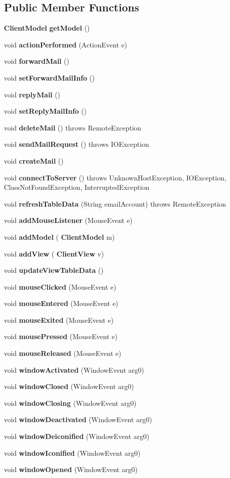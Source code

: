 \subsection*{Public Member Functions}
\begin{DoxyCompactItemize}
\item 
\textbf{ Client\+Model} \textbf{ get\+Model} ()
\item 
void \textbf{ action\+Performed} (Action\+Event e)
\item 
void \textbf{ forward\+Mail} ()
\item 
void \textbf{ set\+Forward\+Mail\+Info} ()
\item 
void \textbf{ reply\+Mail} ()
\item 
void \textbf{ set\+Reply\+Mail\+Info} ()
\item 
void \textbf{ delete\+Mail} ()  throws Remote\+Exception 	
\item 
void \textbf{ send\+Mail\+Request} ()  throws I\+O\+Exception 
\item 
void \textbf{ create\+Mail} ()
\item 
void \textbf{ connect\+To\+Server} ()  throws Unknown\+Host\+Exception, I\+O\+Exception, Class\+Not\+Found\+Exception, Interrupted\+Exception 
\item 
void \textbf{ refresh\+Table\+Data} (String email\+Account)  throws Remote\+Exception 
\item 
void \textbf{ add\+Mouse\+Listener} (Mouse\+Event e)
\item 
void \textbf{ add\+Model} (\textbf{ Client\+Model} m)
\item 
void \textbf{ add\+View} (\textbf{ Client\+View} v)
\item 
void \textbf{ update\+View\+Table\+Data} ()
\item 
void \textbf{ mouse\+Clicked} (Mouse\+Event e)
\item 
void \textbf{ mouse\+Entered} (Mouse\+Event e)
\item 
void \textbf{ mouse\+Exited} (Mouse\+Event e)
\item 
void \textbf{ mouse\+Pressed} (Mouse\+Event e)
\item 
void \textbf{ mouse\+Released} (Mouse\+Event e)
\item 
void \textbf{ window\+Activated} (Window\+Event arg0)
\item 
void \textbf{ window\+Closed} (Window\+Event arg0)
\item 
void \textbf{ window\+Closing} (Window\+Event arg0)
\item 
void \textbf{ window\+Deactivated} (Window\+Event arg0)
\item 
void \textbf{ window\+Deiconified} (Window\+Event arg0)
\item 
void \textbf{ window\+Iconified} (Window\+Event arg0)
\item 
void \textbf{ window\+Opened} (Window\+Event arg0)
\end{DoxyCompactItemize}
